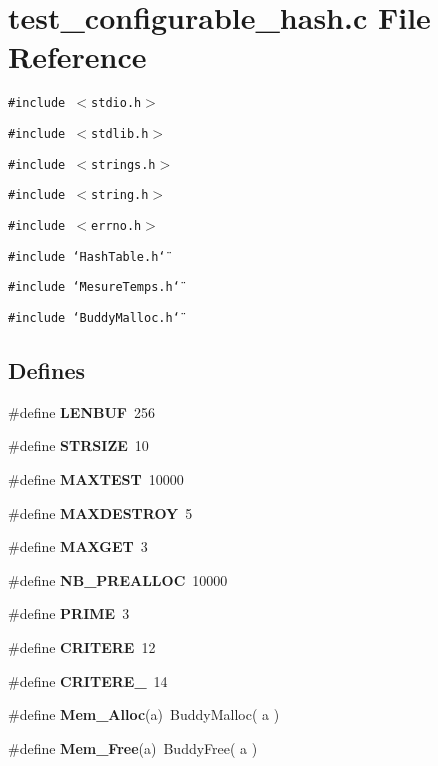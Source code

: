 \section{test\_\-configurable\_\-hash.c File Reference}
\label{test__configurable__hash_8c}
{\tt \#include $<$stdio.h$>$}\par
{\tt \#include $<$stdlib.h$>$}\par
{\tt \#include $<$strings.h$>$}\par
{\tt \#include $<$string.h$>$}\par
{\tt \#include $<$errno.h$>$}\par
{\tt \#include \char`\"{}Hash\-Table.h\char`\"{}}\par
{\tt \#include \char`\"{}Mesure\-Temps.h\char`\"{}}\par
{\tt \#include \char`\"{}Buddy\-Malloc.h\char`\"{}}\par
\subsection*{Defines}
\begin{CompactItemize}
\item 
\#define {\bf LENBUF}\ 256
\item 
\#define {\bf STRSIZE}\ 10
\item 
\#define {\bf MAXTEST}\ 10000
\item 
\#define {\bf MAXDESTROY}\ 5
\item 
\#define {\bf MAXGET}\ 3
\item 
\#define {\bf NB\_\-PREALLOC}\ 10000
\item 
\#define {\bf PRIME}\ 3
\item 
\#define {\bf CRITERE}\ 12
\item 
\#define {\bf CRITERE\_}\ 14
\item 
\#define {\bf Mem\_\-Alloc}(a)\ Buddy\-Malloc( a )
\item 
\#define {\bf Mem\_\-Free}(a)\ Buddy\-Free( a )
\end{CompactItemize}
